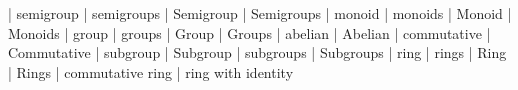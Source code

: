 | semigroup
| semigroups
| Semigroup
| Semigroups
| monoid
| monoids
| Monoid
| Monoids
| group
| groups
| Group
| Groups
| abelian
| Abelian
| commutative
| Commutative
| subgroup
| Subgroup
| subgroups
| Subgroups
| ring
| rings
| Ring
| Rings
| commutative ring
| ring with identity
